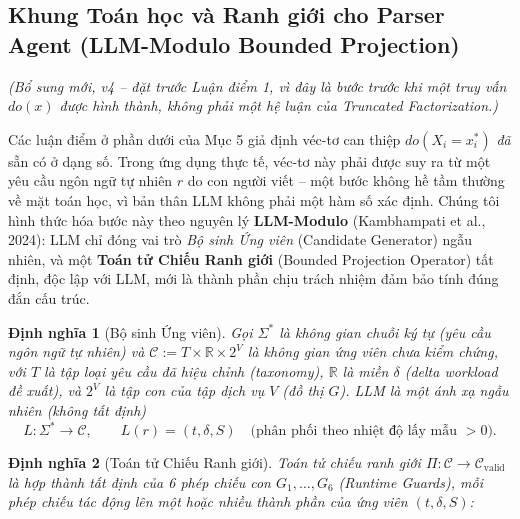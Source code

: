 \documentclass[11pt,a4paper]{article}
\newtheorem{definition}{Định nghĩa}
\begin{document}
\subsection{Khung Toán học và Ranh giới cho Parser Agent (LLM-Modulo Bounded Projection)}
\label{sec:llm-modulo}
\textit{(Bổ sung mới, v4 -- đặt trước Luận điểm 1, vì đây là bước \emph{trước} khi một truy vấn $do(x)$ được hình thành, không phải một hệ luận của Truncated Factorization.)}

Các luận điểm ở phần dưới của Mục 5 giả định véc-tơ can thiệp $do(X_i = x_i^*)$ \emph{đã} sẵn có ở dạng số. Trong ứng dụng thực tế, véc-tơ này phải được suy ra từ một yêu cầu ngôn ngữ tự nhiên $r$ do con người viết -- một bước không hề tầm thường về mặt toán học, vì bản thân LLM không phải một hàm số xác định. Chúng tôi hình thức hóa bước này theo nguyên lý \textbf{LLM-Modulo} (Kambhampati et al., 2024): LLM chỉ đóng vai trò \emph{Bộ sinh Ứng viên} (Candidate Generator) ngẫu nhiên, và một \textbf{Toán tử Chiếu Ranh giới} (Bounded Projection Operator) tất định, độc lập với LLM, mới là thành phần chịu trách nhiệm đảm bảo tính đúng đắn cấu trúc.

\begin{definition}[Bộ sinh Ứng viên]
Gọi $\Sigma^*$ là không gian chuỗi ký tự (yêu cầu ngôn ngữ tự nhiên) và $\mathcal{C} := T \times \mathbb{R} \times 2^V$ là không gian ứng viên chưa kiểm chứng, với $T$ là tập loại yêu cầu đã hiệu chỉnh (taxonomy), $\mathbb{R}$ là miền $\delta$ (delta workload đề xuất), và $2^V$ là tập con của tập dịch vụ $V$ (đồ thị $G$). LLM là một ánh xạ ngẫu nhiên (không tất định)
\begin{equation}
L : \Sigma^* \to \mathcal{C}, \qquad L(r) = (t, \delta, S) \quad \text{(phân phối theo nhiệt độ lấy mẫu $>0$).}
\end{equation}
\end{definition}

\begin{definition}[Toán tử Chiếu Ranh giới]
Toán tử chiếu ranh giới $\Pi : \mathcal{C} \to \mathcal{C}_{\text{valid}}$ là hợp thành tất định của 6 phép chiếu con $G_1, \dots, G_6$ (Runtime Guards), mỗi phép chiếu tác động lên một hoặc nhiều thành phần của ứng viên $(t, \delta, S)$:
\end{definition}
\end{document}
